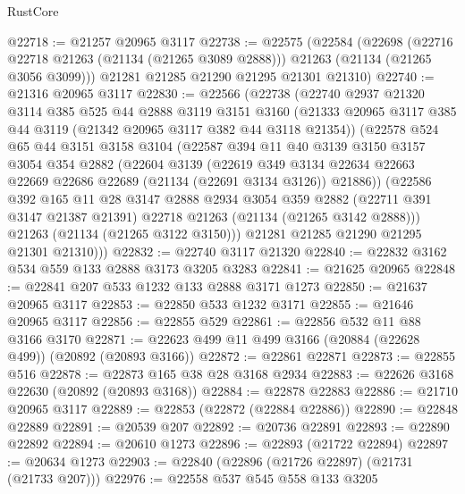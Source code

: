 \begin{lexlean}{RustCore}
\begin{coremodule}
@22718 := @21257 @20965 @3117
@22738 := @22575
    (@22584
      (@22698
        (@22716 @22718 @21263 (@21134 (@21265 @3089 @2888)))
        @21263
        (@21134 (@21265 @3056 @3099)))
      @21281
      @21285
      @21290
      @21295
      @21301
      @21310)
@22740 := @21316 @20965 @3117
@22830 := @22566
    (@22738
      (@22740
        @2937
        @21320
        @3114
        @385
        @525
        @44
        @2888
        @3119
        @3151
        @3160
        (@21333 @20965 @3117 @385 @44 @3119 (@21342 @20965 @3117 @382 @44 @3118 @21354))
        (@22578
          @524
          @65
          @44
          @3151
          @3158
          @3104
          (@22587
            @394
            @11
            @40
            @3139
            @3150
            @3157
            @3054
            @354
            @2882
            (@22604
              @3139
              (@22619
                @349
                @3134
                @22634
                @22663
                @22669
                @22686
                @22689
                (@21134 (@22691 @3134 @3126))
                @21886))
            (@22586
              @392
              @165
              @11
              @28
              @3147
              @2888
              @2934
              @3054
              @359
              @2882
              (@22711 @391 @3147 @21387 @21391)
              @22718
              @21263
              (@21134 (@21265 @3142 @2888)))
            @21263
            (@21134 (@21265 @3122 @3150)))
          @21281
          @21285
          @21290
          @21295
          @21301
          @21310)))
@22832 := @22740 @3117 @21320
@22840 := @22832 @3162 @534 @559 @133 @2888 @3173 @3205 @3283
@22841 := @21625 @20965
@22848 := @22841 @207 @533 @1232 @133 @2888 @3171 @1273
@22850 := @21637 @20965 @3117
@22853 := @22850 @533 @1232 @3171
@22855 := @21646 @20965 @3117
@22856 := @22855 @529
@22861 := @22856 @532 @11 @88 @3166 @3170
@22871 := @22623 @499 @11 @499 @3166 (@20884 (@22628 @499)) (@20892 (@20893 @3166))
@22872 := @22861 @22871
@22873 := @22855 @516
@22878 := @22873 @165 @38 @28 @3168 @2934
@22883 := @22626 @3168 @22630 (@20892 (@20893 @3168))
@22884 := @22878 @22883
@22886 := @21710 @20965 @3117
@22889 := @22853 (@22872 (@22884 @22886))
@22890 := @22848 @22889
@22891 := @20539 @207
@22892 := @20736 @22891
@22893 := @22890 @22892
@22894 := @20610 @1273
@22896 := @22893 (@21722 @22894)
@22897 := @20634 @1273
@22903 := @22840 (@22896 (@21726 @22897) (@21731 (@21733 @207)))
@22976 := @22558
    @537
    @545
    @558
    @133
    @3205

\end{coremodule}
\end{lexlean}
